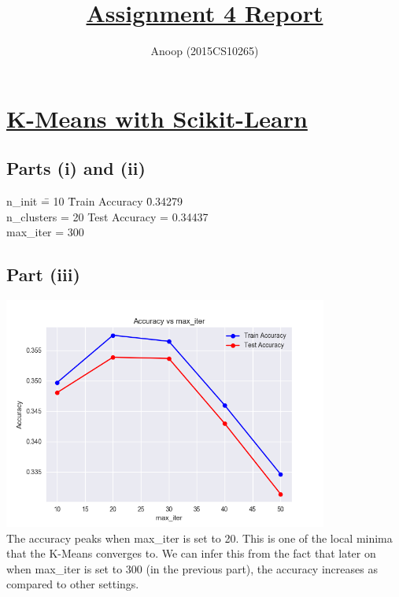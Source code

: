 \documentclass[12pt]{article}
\title{\textbf{\underline{Assignment 4 Report}}}
\author{Anoop (2015CS10265)}
\begin{document}
\maketitle

\section*{\underline{K-Means with Scikit-Learn}}
\subsection*{Parts (i) and (ii)}
\begin{addmargin}[0.3in]{0in}
\begin{tabbing}
n\_init \qquad \= = 10 \qquad \qquad \= Train Accuracy \= 0.34279 \\
n\_clusters \> = 20 \> Test Accuracy \> = 0.34437 \\
max\_iter \> = 300 \\
\end{tabbing}
\end{addmargin}
\subsection*{Part (iii)}
\begin{addmargin}[0.3in]{0in}
\includegraphics[width=0.8\textwidth]{kmeans.png} \\
The accuracy peaks when max\_iter is set to 20. This is one of the local minima that the K-Means converges to. We can infer this from the fact that later on when max\_iter is set to 300 (in the previous part), the accuracy increases as compared to other settings.
\end{addmargin}
\end{document}
